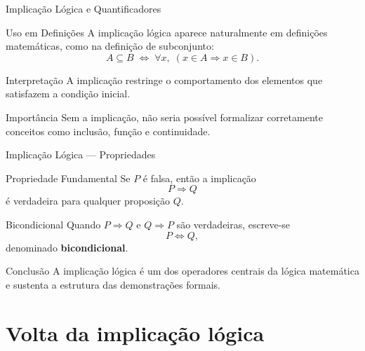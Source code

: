 \documentclass[9pt]{beamer}
\begin{document}
\begin{frame}{Implicação Lógica e Quantificadores}

\begin{block}{Uso em Definições}
A implicação lógica aparece naturalmente em definições matemáticas,
como na definição de subconjunto:
\[
A \subseteq B \;\Longleftrightarrow\;
\forall x,\; (x \in A \Rightarrow x \in B).
\]
\end{block}

\begin{block}{Interpretação}
A implicação restringe o comportamento dos elementos que satisfazem
a condição inicial.
\end{block}

\begin{block}{Importância}
Sem a implicação, não seria possível formalizar corretamente conceitos
como inclusão, função e continuidade.
\end{block}

\end{frame}
\begin{frame}{Implicação Lógica — Propriedades}

\begin{block}{Propriedade Fundamental}
Se $P$ é falsa, então a implicação
\[
P \Rightarrow Q
\]
é verdadeira para qualquer proposição $Q$.
\end{block}

\begin{block}{Bicondicional}
Quando $P \Rightarrow Q$ e $Q \Rightarrow P$ são verdadeiras,
escreve-se
\[
P \Leftrightarrow Q,
\]
denominado \textbf{bicondicional}.
\end{block}

\begin{block}{Conclusão}
A implicação lógica é um dos operadores centrais da lógica matemática
e sustenta a estrutura das demonstrações formais.
\end{block}

\end{frame}
\section{Volta da implicação lógica}
\end{document}
